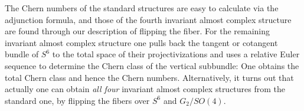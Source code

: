 \documentclass[parskip=half]{scrartcl}
\begin{document}
The Chern numbers of the standard structures are easy to calculate via the adjunction formula, and those of the fourth invariant almost complex structure are found through our description of flipping the fiber. For the remaining invariant almost complex structure one pulls back the tangent or cotangent bundle of $S^6$ to the total space of their projectivizations and uses a relative Euler sequence to determine the Chern class of the vertical subbundle: One obtains the total Chern class and hence the Chern numbers. Alternatively, it turns out that actually one can obtain \emph{all four} invariant almost complex structures from the standard one, by flipping the fibers over $S^6$ and $G_2/SO(4)$.
\end{document}
